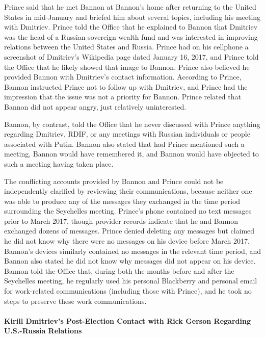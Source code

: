 Prince said that he met Bannon at Bannon's home after returning to the United States in mid-January and briefed him about several topics, including his meeting with Dmitriev.%
Prince told the Office that he explained to Bannon that Dmitriev was the head of a Russian sovereign wealth fund and was interested in improving relations between the United States and Russia.%
Prince had on his cellphone a screenshot of Dmitriev's Wikipedia page dated January 16, 2017, and Prince told the Office that he likely showed that image to Bannon.%
Prince also believed he provided Bannon with Dmitriev's contact information.%
According to Prince, Bannon instructed Prince not to follow up with Dmitriev, and Prince had the impression that the issue was not a priority for Bannon.%
Prince related that Bannon did not appear angry, just relatively uninterested.%

Bannon, by contrast, told the Office that he never discussed with Prince anything regarding Dmitriev, RDIF, or any meetings with Russian individuals or people associated with Putin.%
Bannon also stated that had Prince mentioned such a meeting, Bannon would have remembered it, and Bannon would have objected to such a meeting having taken place.%

The conflicting accounts provided by Bannon and Prince could not be independently clarified by reviewing their communications, because neither one was able to produce any of the messages they exchanged in the time period surrounding the Seychelles meeting.
Prince's phone contained no text messages prior to March 2017, though provider records indicate that he and Bannon exchanged dozens of messages.%
Prince denied deleting any messages but claimed he did not know why there were no messages on his device before March 2017.%
Bannon's devices similarly contained no messages in the relevant time period, and Bannon also stated he did not know why messages did not appear on his device.%
Bannon told the Office that, during both the months before and after the Seychelles meeting, he regularly used his personal Blackberry and personal email for work-related communications (including those with Prince), and he took no steps to preserve these work communications.%

\paragraph{Kirill Dmitriev's Post-Election Contact with Rick Gerson Regarding U.S.-Russia Relations}

